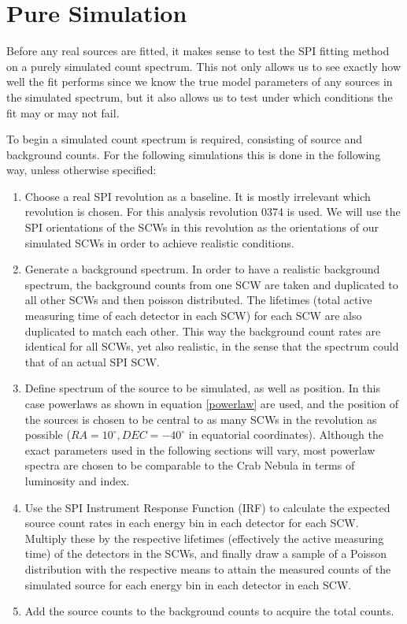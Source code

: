 \documentclass{report}
\begin{document}
\section{Pure Simulation}\label{sec: pure sim}
Before any real sources are fitted, it makes sense to test the SPI fitting method on a purely simulated count spectrum. This not only allows us to see exactly how well the fit performs since we know the true model parameters of any sources in the simulated spectrum, but it also allows us to test under which conditions the fit may or may not fail.

To begin a simulated count spectrum is required, consisting of source and background counts. For the following simulations this is done in the following way, unless otherwise specified:

\begin{enumerate} 
  \item Choose a real SPI revolution as a baseline. It is mostly irrelevant which revolution is chosen. For this analysis revolution 0374 is used. We will use the SPI orientations of the SCWs in this revolution as the orientations of our simulated SCWs in order to achieve realistic conditions. 
  \item \label{step pure sim back}Generate a background spectrum. In order to have a realistic background spectrum, the background counts from one SCW are taken and duplicated to all other SCWs and then poisson distributed. The lifetimes (total active measuring time of each detector in each SCW) for each SCW are also duplicated to match each other. This way the background count rates are identical for all SCWs, yet also realistic, in the sense that the spectrum could that of an actual SPI SCW.
  \item Define spectrum of the source to be simulated, as well as position. In this case powerlaws as shown in equation \ref{powerlaw} are used, and the position of the sources is chosen to be central to as many SCWs in the revolution as possible ($RA=10^\circ, DEC=-40^\circ$ in equatorial coordinates). Although the exact parameters used in the following sections will vary, most powerlaw spectra are chosen to be comparable to the Crab Nebula in terms of luminosity and index.
  \item Use the SPI Instrument Response Function (IRF) to calculate the expected source count rates in each energy bin in each detector for each SCW. Multiply these by the respective lifetimes (effectively the active measuring time) of the detectors in the SCWs, and finally draw a sample of a Poisson distribution with the respective means to attain the measured counts of the simulated source for each energy bin in each detector in each SCW.
  \item Add the source counts to the background counts to acquire the total counts.
\end{enumerate}
\end{document}
